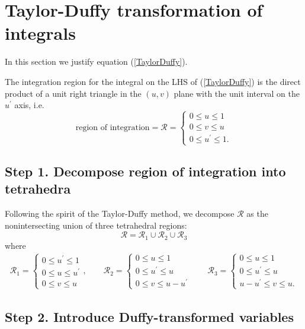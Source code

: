 \documentclass[letterpaper]{article}
\begin{document}
\appendix
\newpage
\section{Taylor-Duffy transformation of integrals}
\label{EdgePanelAppendix}

In this section we justify equation 
(\ref{TaylorDuffy}).

The integration region for the integral on the LHS of 
(\ref{TaylorDuffy}) is the direct product of a unit
right triangle in the $(u,v)$ plane with the unit 
interval on the $u^\prime$ axis, i.e. 
$$\text{region of integration}=\mathcal{R}=
  \begin{cases}
  0\le u \le 1 \\
  0\le v \le u \\
  0\le u^\prime \le 1.
  \end{cases}
$$

\subsection*{Step 1. Decompose region of integration into tetrahedra}

Following the spirit of the Taylor-Duffy method, we 
decompose $\mathcal{R}$ as the nonintersecting union 
of three tetrahedral regions:
$$ \mathcal{R} = \mathcal{R}_1 \cup
                 \mathcal{R}_2 \cup
                 \mathcal{R}_3
$$
where 
\begin{align*}
  \mathcal{R}_1 = 
  \begin{cases}
  0 \le u^\prime \le 1 \\
  0 \le u \le u^\prime \\
  0 \le v \le u
  \end{cases},
\qquad
  \mathcal{R}_2 = 
  \begin{cases}
  0 \le u \le 1 \\
  0 \le u^\prime \le u \\
  0 \le v \le u-u^\prime
  \end{cases}
\qquad
  \mathcal{R}_3 = 
  \begin{cases}
  0 \le u \le 1 \\
  0 \le u^\prime \le u \\
  u-u^\prime \le v \le u.
  \end{cases}
\end{align*}

\subsection*{Step 2. Introduce Duffy-transformed variables} 
\end{document}
